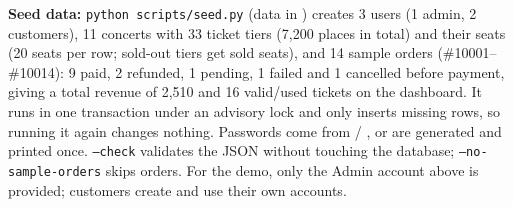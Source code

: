 \documentclass[11pt,a4paper]{article}
\newcommand{\code}[1]{\begingroup\let\codeus\_\renewcommand{\_}{\codeus\allowbreak}\texttt{#1}\endgroup}
\begin{document}
\textbf{Seed data:} \code{python scripts/\allowbreak{}seed.\allowbreak{}py} (data in ) creates
3 users (1 admin, 2 customers), 11 concerts with 33 ticket tiers (7{,}200 places in total) and their
seats (20 seats per row; sold-out tiers get sold seats), and 14 sample orders (\#10001--\#10014):
9 paid, 2 refunded, 1 pending, 1 failed and 1 cancelled before payment, giving a total revenue of
2{,}510 and 16 valid/used tickets on the dashboard. It runs in one transaction under an advisory lock
and only inserts missing rows, so running it again changes nothing. Passwords come from
 / , or are generated and printed once.
\code{--check} validates the JSON without touching the database; \code{--no-sample-orders} skips orders.
For the demo, only the Admin account above is provided; customers create and use their own accounts.


\end{document}

